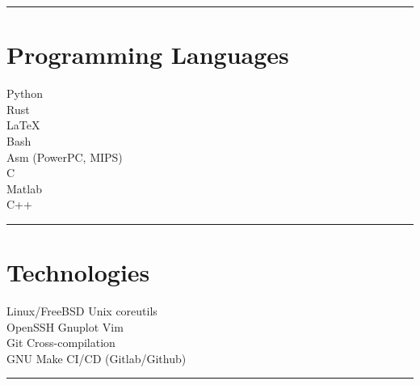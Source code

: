 \documentclass[letterpaper]{deedy-resume}
\begin{document}
\begin{minipage}[t]{0.3\textwidth}
\sectionspace %
\vspace{-1ex}
\rule{5cm}{0.5pt}
\vspace{2em}


\section{Programming Languages}

\vspace{1em}

\textbullet{} Python \\
\textbullet{} Rust\\
\textbullet{} \LaTeX \\
\textbullet{} Bash \\
\textbullet{} Asm (PowerPC, MIPS) \\
\textbullet{} C \\
\textbullet{} Matlab \\
\textbullet{} C++ \\

\sectionspace %
\vspace{-1ex}
\rule{5cm}{0.5pt}
\vspace{2em}

\section{Technologies}

\vspace{1em}

Linux/FreeBSD \textbullet{} Unix coreutils\\
OpenSSH \textbullet{} Gnuplot \textbullet{} Vim\\
Git \textbullet{} Cross-compilation\\
GNU Make \textbullet{} CI/CD (Gitlab/Github)
\sectionspace
\vspace{-1.5ex}
\rule{5cm}{0.5pt}
\vspace{2em}




\end{minipage}
\end{document}
